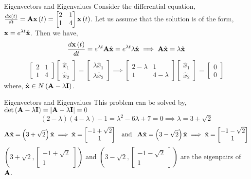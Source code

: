 \documentclass[aspectratio=169]{beamer}
\def\mf{\ensuremath\mathbf}
\begin{document}
\begin{frame}[t]{Eigenvectors and Eigenvalues}
Consider the differential equation, $\frac{d\mf{x}\left(t\right)}{dt} = \mf{A}\mf{x}\left(t\right) = \begin{bmatrix*}2 & 1\\1 & 4\end{bmatrix*}\mf{x}\left(t\right)$. Let us assume that the solution is of the form, $\mf{x} = e^{\lambda t}\hat{\mf{x}}$. Then we have,
\[ \frac{d\mf{x}\left(t\right)}{dt} = e^{\lambda t}\mf{A}\hat{\mf{x}} = e^{\lambda t} \lambda \hat{\mf{x}} \implies \mf{A}\hat{\mf{x}} = \lambda \hat{\mf{x}} \]
\[ \begin{bmatrix*}2 & 1\\1 & 4\end{bmatrix*}\begin{bmatrix*}\hat{x}_1\\\hat{x}_2\end{bmatrix*} = \begin{bmatrix*}\lambda \hat{x}_1\\\lambda \hat{x}_2\end{bmatrix*} \implies \begin{bmatrix*}2 - \lambda & 1\\1 & 4 - \lambda\end{bmatrix*}\begin{bmatrix*}\hat{x}_1\\\hat{x}_2\end{bmatrix*} = \begin{bmatrix*}0\\0\end{bmatrix*} \]
where, $\hat{\mf{x}} \in N\left(\mf{A} - \lambda\mf{I}\right)$.
\end{frame}



\begin{frame}[t]{Eigenvectors and Eigenvalues}
This problem can be solved by, $\det \left(\mf{A} - \lambda\mf{I}\right) = \left\lvert\mf{A} - \lambda\mf{I}\right\rvert = 0$
\[ \left(2 - \lambda\right)\left(4 - \lambda\right) - 1  = \lambda^2 - 6\lambda + 7 = 0 \implies \lambda = 3 \pm \sqrt{2} \]
\[ \mf{A}\hat{\mf{x}} = \left(3 + \sqrt{2}\right) \hat{\mf{x}} \implies \hat{\mf{x}} =  \begin{bmatrix*}-1 + \sqrt{2}\\1\end{bmatrix*} \,\,\, \text{ and } \,\,\, \mf{A}\hat{\mf{x}} = \left(3 - \sqrt{2}\right) \hat{\mf{x}} \implies \hat{\mf{x}} =  \begin{bmatrix*}-1 - \sqrt{2}\\1\end{bmatrix*} \]
$\left(3 + \sqrt{2}, \begin{bmatrix*}-1 + \sqrt{2}\\1\end{bmatrix*}\right)$ and $\left(3 - \sqrt{2}, \begin{bmatrix*}-1 - \sqrt{2}\\1\end{bmatrix*}\right)$ are the eigenpairs of $\mf{A}$.
\end{frame}
\end{document}
